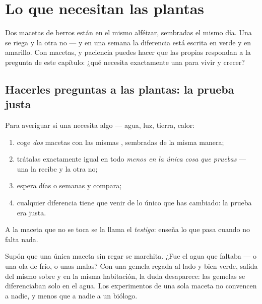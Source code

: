 \chapter{Lo que necesitan las plantas}\label{ch:g4:what-plants-need}

Dos macetas de berros están en el mismo alféizar, sembradas el mismo
día. Una se riega y la otra no --- y en una semana la diferencia está
escrita en verde y en amarillo. Con macetas,  y paciencia
puedes hacer que las propias  respondan a la pregunta de este
capítulo: ¿qué necesita exactamente una  para vivir y crecer?

\section{Hacerles preguntas a las plantas: la prueba justa}

\begin{method}\label{met:g4:what-plants-need:fairtest}
Para averiguar si una  necesita algo --- agua, luz, tierra,
calor:
\begin{enumerate}
  \item coge \emph{dos} macetas con las mismas , sembradas de la
        misma manera;
  \item trátalas exactamente igual en todo \emph{menos en la única cosa
        que pruebas} --- una la recibe y la otra no;
  \item espera días o semanas y compara;
  \item cualquier diferencia tiene que venir de lo único que has
        cambiado: la prueba era justa.
\end{enumerate}
A la maceta que no se toca se la llama el \emph{testigo}: enseña lo que pasa cuando no falta nada.
\end{method}

\begin{example}\label{ex:g4:what-plants-need:control}
Supón que una única maceta sin regar se marchita. ¿Fue el agua que
faltaba --- o una ola de frío, o unas  malas? Con una gemela
regada al lado y bien verde, salida del mismo sobre y en la misma
habitación, la duda desaparece: las gemelas se diferenciaban solo en
el agua. Los experimentos de una sola maceta no convencen a nadie, y
menos que a nadie a un biólogo.
\end{example}


